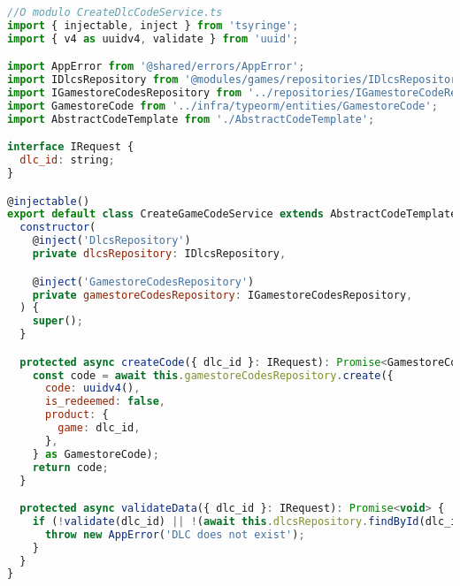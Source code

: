 \begin{lstlisting}[language=JavaScript, caption={Implementação de acordo com o OCP},captionpos=b, label=alg:ocpexample]  
//O modulo CreateDlcCodeService.ts
import { injectable, inject } from 'tsyringe';
import { v4 as uuidv4, validate } from 'uuid';

import AppError from '@shared/errors/AppError';
import IDlcsRepository from '@modules/games/repositories/IDlcsRepository';
import IGamestoreCodesRepository from '../repositories/IGamestoreCodeRepository';
import GamestoreCode from '../infra/typeorm/entities/GamestoreCode';
import AbstractCodeTemplate from './AbstractCodeTemplate';

interface IRequest {
  dlc_id: string;
}

@injectable()
export default class CreateGameCodeService extends AbstractCodeTemplate {
  constructor(
    @inject('DlcsRepository')
    private dlcsRepository: IDlcsRepository,

    @inject('GamestoreCodesRepository')
    private gamestoreCodesRepository: IGamestoreCodesRepository,
  ) {
    super();
  }

  protected async createCode({ dlc_id }: IRequest): Promise<GamestoreCode> {
    const code = await this.gamestoreCodesRepository.create({
      code: uuidv4(),
      is_redeemed: false,
      product: {
        game: dlc_id,
      },
    } as GamestoreCode);
    return code;
  }

  protected async validateData({ dlc_id }: IRequest): Promise<void> {
    if (!validate(dlc_id) || !(await this.dlcsRepository.findById(dlc_id))) {
      throw new AppError('DLC does not exist');
    }
  }
}
  \end{lstlisting}